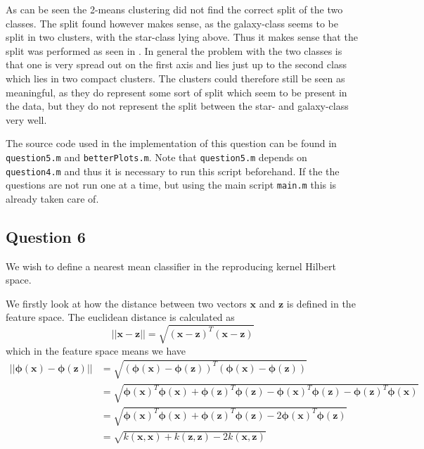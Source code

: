 \documentclass[a4paper, 11pt]{article}
\begin{document}
As can be seen the 2-means clustering did not find the correct split of the two classes. The split found however makes sense, as the galaxy-class seems to be split in two clusters, with the star-class lying above. Thus it makes sense that the split was performed as seen in . In general the problem with the two classes is that one is very spread out on the first axis and lies just up to the second class which lies in two compact clusters. The clusters could therefore still be seen as meaningful, as they do represent some sort of split which seem to be present in the data, but they do not represent the split between the star- and galaxy-class very well.

The source code used in the implementation of this question can be found in \texttt{question5.m} and \texttt{betterPlots.m}. Note that \texttt{question5.m} depends on \texttt{question4.m} and thus it is necessary to run this script beforehand. If the the questions are not run one at a time, but using the main script \texttt{main.m} this is already taken care of.

\subsection*{Question 6}
We wish to define a nearest mean classifier in the reproducing kernel Hilbert space.

We firstly look at how the distance between two vectors $\mathbf{x}$ and $\mathbf{z}$ is defined in the feature space. The euclidean distance is calculated as
\[
    || \mathbf{x} - \mathbf{z} || = \sqrt{{(\mathbf{x} - \mathbf{z})}^T (\mathbf{x} - \mathbf{z})}
\]
which in the feature space means we have
\begin{align*}
    || \bm\phi(\mathbf{x}) - \bm\phi(\mathbf{z}) ||
    &= \sqrt{{(\bm\phi(\mathbf{x}) - \bm\phi(\mathbf{z}))}^T (\bm\phi(\mathbf{x}) - \bm\phi(\mathbf{z}))} \\
    &= \sqrt{{\bm\phi(\mathbf{x})}^T \bm\phi(\mathbf{x}) + {\bm\phi(\mathbf{z})}^T \bm\phi(\mathbf{z}) - {\bm\phi(\mathbf{x})}^T \bm\phi(\mathbf{z}) - {\bm\phi(\mathbf{z})}^T \bm\phi(\mathbf{x})} \\
    &= \sqrt{{\bm\phi(\mathbf{x})}^T \bm\phi(\mathbf{x}) + {\bm\phi(\mathbf{z})}^T \bm\phi(\mathbf{z}) - 2 {\bm\phi(\mathbf{x})}^T \bm\phi(\mathbf{z})} \\
    &= \sqrt{k(\mathbf{x}, \mathbf{x}) + k(\mathbf{z}, \mathbf{z}) - 2 k(\mathbf{x}, \mathbf{z})}
\end{align*}
\end{document}
